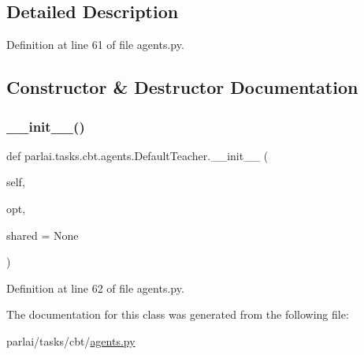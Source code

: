 \subsection{Detailed Description}


Definition at line 61 of file agents.\+py.



\subsection{Constructor \& Destructor Documentation}
\mbox{\label{classparlai_1_1tasks_1_1cbt_1_1agents_1_1DefaultTeacher_a2a25b29b63e7edb52d411115ee5e2030}} 
\subsubsection{\texorpdfstring{\+\_\+\+\_\+init\+\_\+\+\_\+()}{\_\_init\_\_()}}
{\footnotesize\ttfamily def parlai.\+tasks.\+cbt.\+agents.\+Default\+Teacher.\+\_\+\+\_\+init\+\_\+\+\_\+ (\begin{DoxyParamCaption}\item[{}]{self,  }\item[{}]{opt,  }\item[{}]{shared = {\ttfamily None} }\end{DoxyParamCaption})}



Definition at line 62 of file agents.\+py.



The documentation for this class was generated from the following file\+:\begin{DoxyCompactItemize}
\item 
parlai/tasks/cbt/\hyperlink{parlai_2tasks_2cbt_2agents_8py}{agents.\+py}\end{DoxyCompactItemize}
